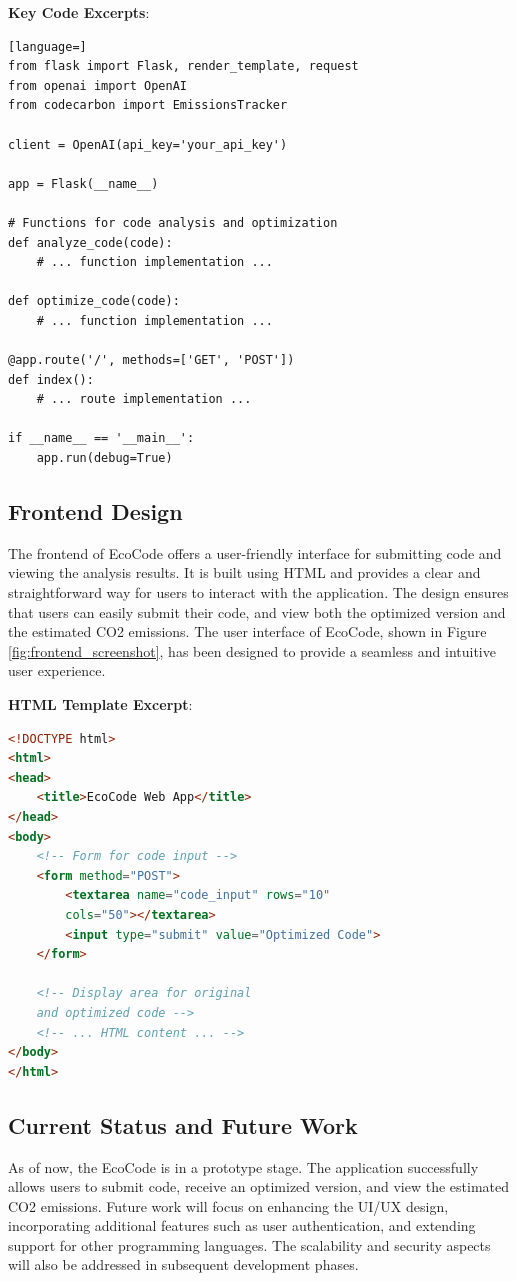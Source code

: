 \documentclass[conference,compsoc]{IEEEtran}
\begin{document}
\textbf{Key Code Excerpts}:
\begin{lstlisting}[language=]
from flask import Flask, render_template, request
from openai import OpenAI
from codecarbon import EmissionsTracker

client = OpenAI(api_key='your_api_key')

app = Flask(__name__)

# Functions for code analysis and optimization
def analyze_code(code):
    # ... function implementation ...

def optimize_code(code):
    # ... function implementation ...

@app.route('/', methods=['GET', 'POST'])
def index():
    # ... route implementation ...

if __name__ == '__main__':
    app.run(debug=True)
\end{lstlisting}

\subsection{Frontend Design}
The frontend of EcoCode offers a user-friendly interface for submitting  code and viewing the analysis results. It is built using HTML and provides a clear and straightforward way for users to interact with the application. The design ensures that users can easily submit their code, and view both the optimized version and the estimated CO2 emissions.
The user interface of EcoCode, shown in Figure \ref{fig:frontend_screenshot}, has been designed to provide a seamless and intuitive user experience.

\textbf{HTML Template Excerpt}:
\begin{lstlisting}[language=HTML]
<!DOCTYPE html>
<html>
<head>
    <title>EcoCode Web App</title>
</head>
<body>
    <!-- Form for code input -->
    <form method="POST">
        <textarea name="code_input" rows="10" 
        cols="50"></textarea>
        <input type="submit" value="Optimized Code">
    </form>

    <!-- Display area for original 
    and optimized code -->
    <!-- ... HTML content ... -->
</body>
</html>
\end{lstlisting}

\subsection{Current Status and Future Work}
As of now, the EcoCode is in a prototype stage. The application successfully allows users to submit  code, receive an optimized version, and view the estimated CO2 emissions. Future work will focus on enhancing the UI/UX design, incorporating additional features such as user authentication, and extending support for other programming languages. The scalability and security aspects will also be addressed in subsequent development phases.
\end{document}
